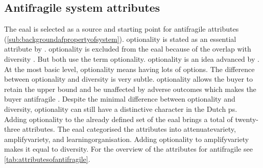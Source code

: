 \subsection{Antifragile system attributes}
\label{sub:attributesofantifragile}
The \acrlong{eaal} is selected as a source and starting point for \gls{antifragile} attributes (\cref{sub:backgroundafpropertyofsystem}). \Gls{optionality} is stated as an essential attribute by \textcites{Taleb2012}[p.~64]{Botjes2020}. \Gls{optionality} is excluded from the \acrlong{eaal} because of the overlap with \gls{diversity} \parencite[p.~64]{Botjes2020}. But \textcites{Taleb2012}[p.~9]{Gorgeon2015} both use the term \gls{optionality}. \Gls{optionality} is an idea advanced by \textcite{Taleb2012}. At the most basic level, \gls{optionality} means having lots of options. The difference between \gls{optionality} and \gls{diversity} is very subtle. \Gls{optionality} allows the buyer to retain the upper bound and be unaffected by adverse outcomes which makes the buyer \gls{antifragile} \parencite{Cunff2020}. Despite the minimal difference between \gls{optionality} and \gls{diversity}, \gls{optionality} can still have a distinctive character in the Dutch \gls{ps}. Adding \gls{optionality} to the already defined set of the \acrlong{eaal} brings a total of twenty-three attributes. The \acrlong{eaal} categorised the attributes into \gls{attenuatevariety}, \gls{amplifyvariety}, and \gls{learningorganisation}. Adding \gls{optionality} to \gls{amplifyvariety} makes it equal to \gls{diversity}. For the overview of the \glspl{attribute} for \gls{antifragile} see \cref{tab:attributesofantifragile}. 
